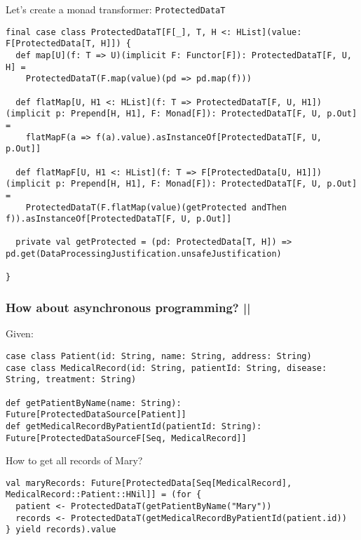 \documentclass[aspectratio=169]{beamer}
\begin{document}
\begin{frame}[fragile]
Let's create a monad transformer: \texttt{ProtectedDataT}

\begin{lstlisting}[style=myScalastyle,frame=none]
final case class ProtectedDataT[F[_], T, H <: HList](value: F[ProtectedData[T, H]]) {
  def map[U](f: T => U)(implicit F: Functor[F]): ProtectedDataT[F, U, H] =
    ProtectedDataT(F.map(value)(pd => pd.map(f)))

  def flatMap[U, H1 <: HList](f: T => ProtectedDataT[F, U, H1])(implicit p: Prepend[H, H1], F: Monad[F]): ProtectedDataT[F, U, p.Out] =
    flatMapF(a => f(a).value).asInstanceOf[ProtectedDataT[F, U, p.Out]]

  def flatMapF[U, H1 <: HList](f: T => F[ProtectedData[U, H1]])(implicit p: Prepend[H, H1], F: Monad[F]): ProtectedDataT[F, U, p.Out] =
    ProtectedDataT(F.flatMap(value)(getProtected andThen f)).asInstanceOf[ProtectedDataT[F, U, p.Out]]

  private val getProtected = (pd: ProtectedData[T, H]) => pd.get(DataProcessingJustification.unsafeJustification)

}
\end{lstlisting}

\end{frame}

\begin{frame}[fragile]
\frametitle{How about asynchronous programming? ||}
Given:
\begin{lstlisting}[style=myScalastyle,frame=none]
case class Patient(id: String, name: String, address: String)
case class MedicalRecord(id: String, patientId: String, disease: String, treatment: String)

def getPatientByName(name: String): Future[ProtectedDataSource[Patient]]
def getMedicalRecordByPatientId(patientId: String): Future[ProtectedDataSourceF[Seq, MedicalRecord]]
\end{lstlisting}
How to get all records of Mary?
\pause
\begin{lstlisting}[style=myScalastyle,frame=none]
val maryRecords: Future[ProtectedData[Seq[MedicalRecord], MedicalRecord::Patient::HNil]] = (for {
  patient <- ProtectedDataT(getPatientByName("Mary"))
  records <- ProtectedDataT(getMedicalRecordByPatientId(patient.id))
} yield records).value
\end{lstlisting}

\end{frame}
\end{document}
